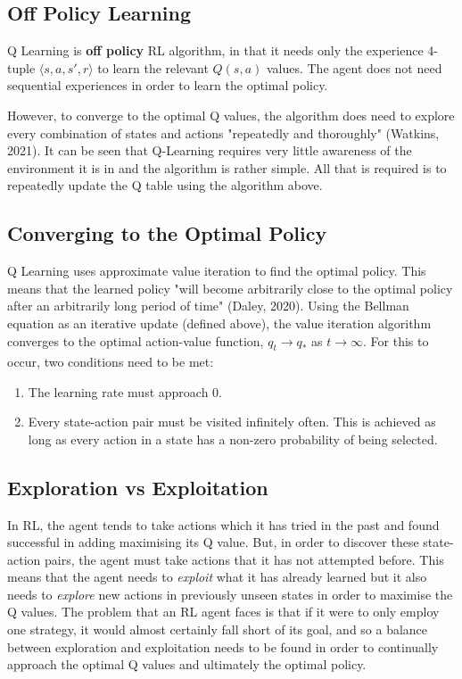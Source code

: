 \documentclass{article}
\begin{document}
\subsection{Off Policy Learning}

Q Learning is \textbf{off policy} RL algorithm, in that it needs only the experience 4-tuple $ \langle s, a, s', r \rangle$ to learn the relevant $Q(s,a)$ values. The agent does not need sequential experiences in order to learn the optimal policy.

However, to converge to the optimal Q values, the algorithm does need to explore every combination of states and actions "repeatedly and thoroughly" (Watkins, 2021). It can be seen that Q-Learning requires very little awareness of the environment it is in and the algorithm is rather simple. All that is required is to repeatedly update the Q table using the algorithm above. 


\subsection{Converging to the Optimal Policy}

Q Learning uses approximate value iteration to find the optimal policy. This means that the learned policy "will become arbitrarily close to the optimal policy after an arbitrarily long period of time" (Daley, 2020). Using the Bellman equation as an iterative update (defined above), the value iteration algorithm converges to the optimal action-value function, $q_t \xrightarrow[]{} q_*$ as $t \xrightarrow[]{} \infty$. For this to occur, two conditions need to be met\cite{mnih2013atari}\cite{RLNotes}:

\begin{enumerate}
    \item The learning rate must approach 0. 
    
    \item Every state-action pair must be visited infinitely often. This is achieved as long as every action in a state has a non-zero probability of being selected. 
\end{enumerate}



\newpage

\subsection{Exploration vs Exploitation}

In RL, the agent tends to take actions which it has tried in the past and found successful in adding maximising its Q value. But, in order to discover these state-action pairs, the agent must take actions that it has not attempted before. This means that the agent needs to \textit{exploit} what it has already learned but it also needs to \textit{explore} new actions in previously unseen states in order to maximise the Q values. The problem that an RL agent faces is that if it were to only employ one strategy, it would almost certainly fall short of its goal, and so a balance between exploration and exploitation needs to be found in order to continually approach the optimal Q values and ultimately the optimal policy. 
\end{document}
